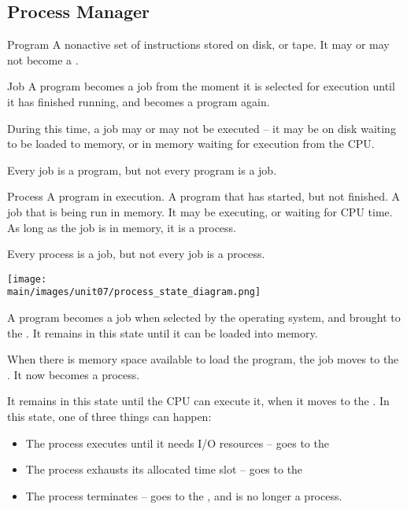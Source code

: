 \documentclass[\main/notes.tex]{subfiles}
\begin{document}
			\subsection{Process Manager}
				\begin{definition}{Program}
					A nonactive set of instructions stored on disk, or tape. It may or may not become a .
				\end{definition}
				\begin{definition}{Job}
					A program becomes a job from the moment it is selected for execution until it has finished running, and becomes a program again.

					During this time, a job may or may not be executed -- it may be on disk waiting to be loaded to memory, or in memory waiting for execution from the CPU.

					Every job is a program, but not every program is a job.
				\end{definition}
				\begin{definition}{Process}
					A program in execution. A program that has started, but not finished. A job that is being run in memory. It may be executing, or waiting for CPU time. As long as the job is in memory, it is a process.

					Every process is a job, but not every job is a process.
				\end{definition}
				\begin{center}
					\texttt{[image: \\main/images/unit07/process\_state\_diagram.png]}
				\end{center}
				A program becomes a job when selected by the operating system, and brought to the . It remains in this state until it can be loaded into memory.

				When there is memory space available to load the program, the job moves to the . It now becomes a process.

				It remains in this state until the CPU can execute it, when it moves to the . In this state, one of three things can happen:
				\begin{itemize}
					\item The process executes until it needs I/O resources -- goes to the 
					\item The process exhausts its allocated time slot -- goes to the 
					\item The process terminates -- goes to the , and is no longer a process.
				\end{itemize}
\end{document}
